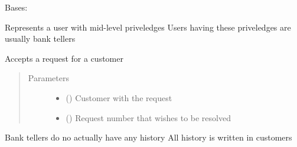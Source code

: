 \documentclass[letterpaper,10pt,english]{sphinxmanual}
\begin{document}
\begin{fulllineitems}
\label{\detokenize{bank:bank.bankTeller.BankTeller}}
Bases: 

Represents a user with mid-level priveledges
Users having these priveledges are usually bank tellers

\begin{fulllineitems}
\label{\detokenize{bank:bank.bankTeller.BankTeller.acceptRequest}}
Accepts a request for a customer
\begin{quote}\begin{description}
\item[{Parameters}] \leavevmode\begin{itemize}
\item {} 
 ({\hyperref[\detokenize{bank:bank.customer.Customer}]{}}) \textendash{} Customer with the request

\item {} 
 () \textendash{} Request number that wishes to be resolved

\end{itemize}

\end{description}\end{quote}

\end{fulllineitems}


\begin{fulllineitems}
\label{\detokenize{bank:bank.bankTeller.BankTeller.addHistory}}
Bank tellers do no actually have any history
All history is written in customers

\end{fulllineitems}



\end{fulllineitems}
\end{document}
